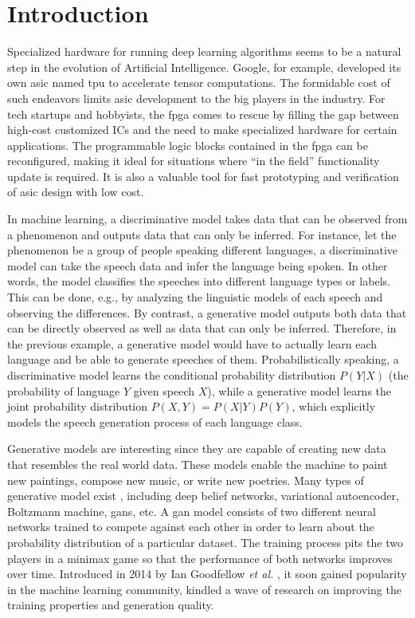 
\chapter{Introduction}

Specialized hardware for running deep learning algorithms seems to be a natural step in the evolution of
Artificial Intelligence.  Google, for example, developed its own \gls{asic} named \gls{tpu}
to accelerate tensor computations. The formidable cost of such endeavors limits \gls{asic} development to
the big players in the industry. For tech startups and hobbyists, the \gls{fpga} comes to rescue by filling
the gap between high-cost customized ICs and the need to make specialized hardware for certain
applications. The programmable logic blocks contained in the \gls{fpga} can be reconfigured, making it
ideal for situations where ``in the field'' functionality update is required. It is also a valuable tool
for fast prototyping and verification of \gls{asic} design with low cost.

In machine learning, a discriminative model takes data that can be observed from a phenomenon and outputs
data that can only be inferred. For instance, let the phenomenon be a group of people speaking different
languages, a discriminative model can take the speech data and infer the language being spoken. In other
words, the model classifies the speeches into different language types or labels. This can be done, e.g.,
by analyzing the linguistic models of each speech and observing the differences. By contrast, a generative
model outputs both data that can be directly observed as well as data that can only be inferred. Therefore,
in the previous example, a generative model would have to actually learn each language and be able to generate
speeches of them. Probabilistically speaking, a discriminative model learns the conditional probability
distribution $P(Y \vert X)$ (the probability of language $Y$ given speech $X$), while a generative model
learns the joint probability distribution $P(X,Y) = P(X \vert Y)P(Y)$, which explicitly models the speech
generation process of each language class.

Generative models are interesting since they are capable of creating new data that resembles the real world
data. These models enable the machine to paint new paintings, compose new music, or write new poetries.
Many types of generative model exist \cite{Goodfellow-et-al-2016},
including deep belief networks, variational autoencoder,
Boltzmann machine, \glspl{gan}, etc. A \gls{gan} model consists of two different neural networks trained to
compete against each other in order to learn about the probability distribution of a particular dataset.
The training process pits the two players in a minimax game so that the performance of both networks improves
over time. Introduced in 2014 by Ian Goodfellow \textit{et al.} \cite{goodfellow:gan}, it soon gained
popularity in the machine learning community, kindled a wave of research on improving the training properties
and generation quality.

